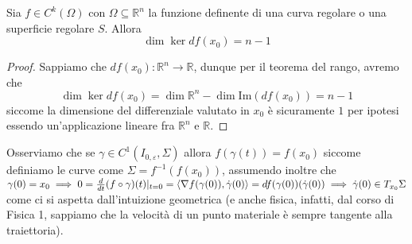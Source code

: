 \documentclass[openany, italian]{book}
\begin{document}
\begin{prop}
Sia $f \in C^{k}(\Omega)$ con $\Omega \subseteq \mathbb{R}^n$ la funzione definente di una curva regolare o una superficie regolare $S$. Allora 
$$
\dim{\ker{df(x_0)}} = n-1
$$
\end{prop}
\begin{proof}
Sappiamo che $df(x_0): \mathbb{R}^n \to \mathbb{R}$, dunque per il teorema del rango, avremo che
$$
\dim{\ker{df(x_0)}} = \dim{\mathbb{R}^n} - \dim{\text{Im}(df(x_0))} = n - 1
$$
siccome la dimensione del differenziale valutato in $x_0$ è sicuramente $1$ per ipotesi essendo un'applicazione lineare fra $\mathbb{R}^n$ e $\mathbb{R}$.
\end{proof}
Osserviamo che se $\gamma \in C^1 (I_{0, \varepsilon}, \Sigma)$ allora $f(\gamma(t)) = f(x_0)$ siccome definiamo le curve come $\Sigma = f^{-1}(f(x_0))$, assumendo inoltre che $\gamma(0) = x_0 \implies 0 = \frac{d}{dt} (f \circ \gamma)(t)|_{t=0} = \langle \nabla f(\gamma(0)), \dot{\gamma}(0) \rangle = df(\gamma(0))(\dot{\gamma}(0)) \implies \dot{\gamma}(0) \in T_{x_0} \Sigma$ come ci si aspetta dall'intuizione geometrica (e anche fisica, infatti, dal corso di Fisica 1, sappiamo che la velocità di un punto materiale è sempre tangente alla traiettoria). 
\end{document}
